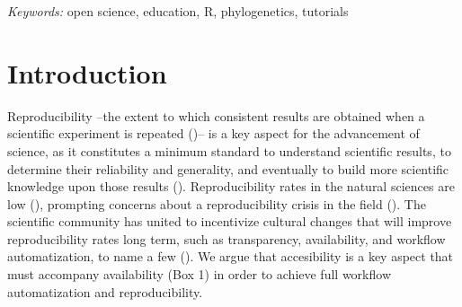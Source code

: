 \documentclass[12pt]{article}
\begin{document}
\noindent%
{\it Keywords:}  open science, education, R, phylogenetics, tutorials
\vfill

\newpage
{} %
\section{Introduction}
\label{sec:intro}

Reproducibility --the extent to which consistent results are obtained when a scientific
experiment is repeated (\cite{repdef2021})-- is a key aspect for the advancement
of science, as it constitutes a minimum standard to understand scientific results,
to determine their reliability and generality, and eventually to build more scientific
knowledge upon those results (\cite{king1995replication, peng2011reproducible, powers2019open}).
Reproducibility rates in the natural sciences are low (\cite{ioannidis2005most, prinz2011believe}),
prompting concerns about a reproducibility crisis in the field (\cite{baker2016reproducibility}).
The scientific community has united to incentivize cultural changes that will improve
reproducibility rates long term, such as transparency, availability, and workflow
automatization, to name a few (\cite{peng2015reproducibility}).
We argue that accesibility is a key aspect that must accompany availability (Box 1)
in order to achieve full workflow automatization and reproducibility.

\bigskip
\bigskip

\noindent{}
\bigskip
\end{document}
